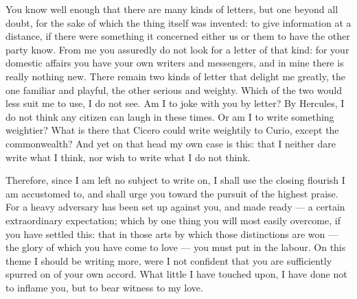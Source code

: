 

 You know well enough that there are many kinds of letters, but one beyond all doubt, for the sake of which the thing itself was invented: to give information at a distance, if there were something it concerned either us or them to have the other party know. From me you assuredly do not look for a letter of that kind: for your domestic affairs you have your own writers and messengers, and in mine there is really nothing new. There remain two kinds of letter that delight me greatly, the one familiar and playful, the other serious and weighty. Which of the two would less suit me to use, I do not see. Am I to joke with you by letter? By Hercules, I do not think any citizen can laugh in these times. Or am I to write something weightier? What is there that Cicero could write weightily to Curio, except the commonwealth? And yet on that head my own case is this: that I neither dare write what I think, nor wish to write what I do not think.

 Therefore, since I am left no subject to write on, I shall use the closing flourish I am accustomed to, and shall urge you toward the pursuit of the highest praise. For a heavy adversary has been set up against you, and made ready --- a certain extraordinary expectation; which by one thing you will most easily overcome, if you have settled this: that in those arts by which those distinctions are won --- the glory of which you have come to love --- you must put in the labour. On this theme I should be writing more, were I not confident that you are sufficiently spurred on of your own accord. What little I have touched upon, I have done not to inflame you, but to bear witness to my love.
